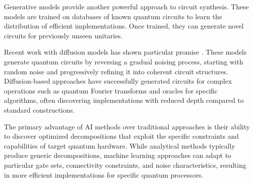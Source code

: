 Generative models provide another powerful approach to circuit synthesis. These models are trained on databases of known quantum circuits to learn the distribution of efficient implementations. Once trained, they can generate novel circuits for previously unseen unitaries.

Recent work with diffusion models has shown particular promise \cite{furrutter2024quantum}. These models generate quantum circuits by reversing a gradual noising process, starting with random noise and progressively refining it into coherent circuit structures. Diffusion-based approaches have successfully generated circuits for complex operations such as quantum Fourier transforms and oracles for specific algorithms, often discovering implementations with reduced depth compared to standard constructions.

The primary advantage of AI methods over traditional approaches is their ability to discover optimized decompositions that exploit the specific constraints and capabilities of target quantum hardware. While analytical methods typically produce generic decompositions, machine learning approaches can adapt to particular gate sets, connectivity constraints, and noise characteristics, resulting in more efficient implementations for specific quantum processors.

